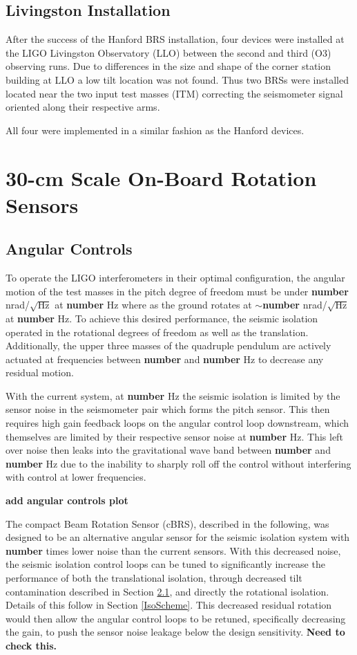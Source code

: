 \documentclass [12pt, proquest]{uwthesis}[2019]
\begin{document}
\section{Livingston Installation}

\quad After the success of the Hanford BRS installation, four devices were installed at the LIGO Livingston Observatory (LLO) between the second and third (O3) observing runs. Due to differences in the size and shape of the corner station building at LLO a low tilt location was not found. Thus two BRSs were installed located near the two input test masses (ITM) correcting the seismometer signal oriented along their respective arms. 

All four were implemented in a similar fashion as the Hanford devices.

\chapter{30-cm Scale On-Board Rotation Sensors}
\section{Angular Controls}

To operate the LIGO interferometers in their optimal configuration, the angular motion of the test masses in the pitch degree of freedom must be under \textbf{number} nrad/$\sqrt{\text{Hz}}$ at \textbf{number} Hz where as the ground rotates at $\sim$\textbf{number} nrad/$\sqrt{\text{Hz}}$ at \textbf{number} Hz. To achieve this desired performance, the seismic isolation operated in the rotational degrees of freedom as well as the translation. Additionally, the upper three masses of the quadruple pendulum are actively actuated at frequencies between \textbf{number} and \textbf{number} Hz to decrease any residual motion.

With the current system, at \textbf{number} Hz the seismic isolation is limited by the sensor noise in the seismometer pair which forms the pitch sensor. This then requires high gain feedback loops on the angular control loop downstream, which themselves are limited by their respective sensor noise at \textbf{number} Hz. This left over noise then leaks into the gravitational wave band between \textbf{number} and \textbf{number} Hz due to the inability to sharply roll off the control without interfering with control at lower frequencies.

\textbf{add angular controls plot}

The compact Beam Rotation Sensor (cBRS), described in the following, was designed to be an alternative angular sensor for the seismic isolation system with \textbf{number} times lower noise than the current sensors. With this decreased noise, the seismic isolation control loops can be tuned to significantly increase the performance of both the translational isolation, through decreased tilt contamination described in Section \ref{}, and directly the rotational isolation. Details of this follow in Section \ref{IsoScheme}. This decreased residual rotation would then allow the angular control loops to be retuned, specifically decreasing the gain, to push the sensor noise leakage below the design sensitivity. \textbf{Need to check this.}
\end{document}
